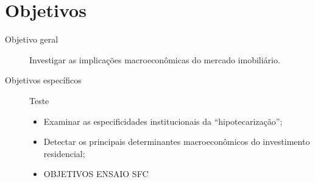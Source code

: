\section{Objetivos}\label{OBJ}


\begin{description}
	\item[Objetivo geral] Investigar as implicações macroeconômicas do mercado imobiliário.
	\item[Objetivos específicos] {\color{white}Teste}
	\begin{itemize}
		\item Examinar as especificidades institucionais da ``hipotecarização'';
		\item Detectar os principais determinantes macroeconômicos do investimento residencial;
		\item OBJETIVOS ENSAIO SFC
	\end{itemize}
\end{description}


